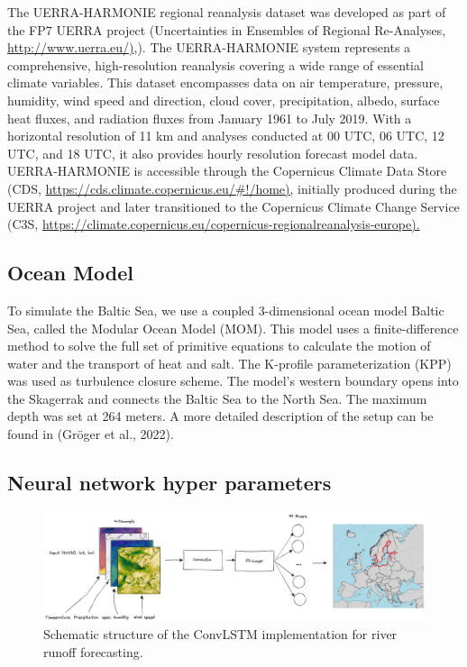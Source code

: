 \documentclass[
]{agujournal2019}
\begin{document}
The UERRA-HARMONIE regional reanalysis dataset was developed as part of
the FP7 UERRA project (Uncertainties in Ensembles of Regional
Re-Analyses, \href{http://www.uerra.eu/}{http://www.uerra.eu/)},). The
UERRA-HARMONIE system represents a comprehensive, high-resolution
reanalysis covering a wide range of essential climate variables. This
dataset encompasses data on air temperature, pressure, humidity, wind
speed and direction, cloud cover, precipitation, albedo, surface heat
fluxes, and radiation fluxes from January 1961 to July 2019. With a
horizontal resolution of 11 km and analyses conducted at 00 UTC, 06 UTC,
12 UTC, and 18 UTC, it also provides hourly resolution forecast model
data. UERRA-HARMONIE is accessible through the Copernicus Climate Data
Store (CDS, \url{https://cds.climate.copernicus.eu/\#!/home),} initially
produced during the UERRA project and later transitioned to the
Copernicus Climate Change Service (C3S,
\url{https://climate.copernicus.eu/copernicus-regionalreanalysis-europe).}

\hypertarget{ocean-model}{%
\subsection{Ocean Model}\label{ocean-model}}

To simulate the Baltic Sea, we use a coupled 3-dimensional ocean model
Baltic Sea, called the Modular Ocean Model (MOM). This model uses a
finite-difference method to solve the full set of primitive equations to
calculate the motion of water and the transport of heat and salt. The
K-profile parameterization (KPP) was used as turbulence closure scheme.
The model's western boundary opens into the Skagerrak and connects the
Baltic Sea to the North Sea. The maximum depth was set at 264 meters. A
more detailed description of the setup can be found in (Gröger et al.,
2022).

\hypertarget{neural-network-hyper-parameters}{%
\subsection{Neural network hyper
parameters}\label{neural-network-hyper-parameters}}

\begin{figure}

{\centering \includegraphics{ConvLSTM.png}

}

\caption{\label{fig-baltNet}Schematic structure of the ConvLSTM
implementation for river runoff forecasting.}

\end{figure}
\end{document}
